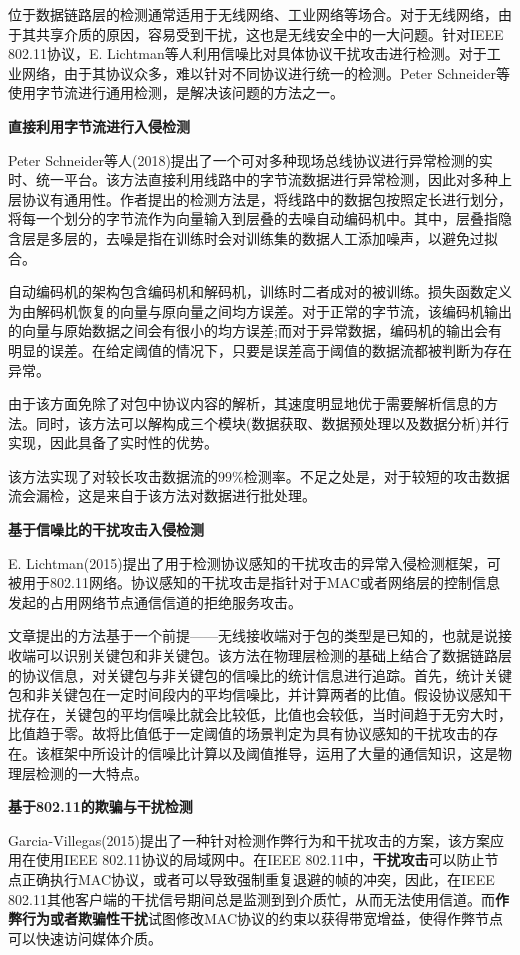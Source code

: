 \documentclass[12pt]{article} %
\begin{document}
位于数据链路层的检测通常适用于无线网络、工业网络等场合。对于无线网络，由于其共享介质的原因，容易受到干扰，这也是无线安全中的一大问题。针对IEEE 802.11协议，E. Lichtman等人利用信噪比对具体协议干扰攻击进行检测。对于工业网络，由于其协议众多，难以针对不同协议进行统一的检测。Peter Schneider等使用字节流进行通用检测，是解决该问题的方法之一。

\textbf{直接利用字节流进行入侵检测}

Peter Schneider等人(2018)\cite{cyber_phy}提出了一个可对多种现场总线协议进行异常检测的实时、统一平台。该方法直接利用线路中的字节流数据进行异常检测，因此对多种上层协议有通用性。作者提出的检测方法是，将线路中的数据包按照定长进行划分，将每一个划分的字节流作为向量输入到层叠的去噪自动编码机中。其中，层叠指隐含层是多层的，去噪是指在训练时会对训练集的数据人工添加噪声，以避免过拟合。

自动编码机的架构包含编码机和解码机，训练时二者成对的被训练。损失函数定义为由解码机恢复的向量与原向量之间均方误差。对于正常的字节流，该编码机输出的向量与原始数据之间会有很小的均方误差;而对于异常数据，编码机的输出会有明显的误差。在给定阈值的情况下，只要是误差高于阈值的数据流都被判断为存在异常。

由于该方面免除了对包中协议内容的解析，其速度明显地优于需要解析信息的方法。同时，该方法可以解构成三个模块(数据获取、数据预处理以及数据分析)并行实现，因此具备了实时性的优势。

该方法实现了对较长攻击数据流的99\%检测率。不足之处是，对于较短的攻击数据流会漏检，这是来自于该方法对数据进行批处理。

\textbf{基于信噪比的干扰攻击入侵检测}

E. Lichtman(2015)\cite{Lichtman}提出了用于检测协议感知的干扰攻击的异常入侵检测框架，可被用于802.11网络。协议感知的干扰攻击是指针对于MAC或者网络层的控制信息发起的占用网络节点通信信道的拒绝服务攻击。

文章提出的方法基于一个前提——无线接收端对于包的类型是已知的，也就是说接收端可以识别关键包和非关键包。该方法在物理层检测的基础上结合了数据链路层的协议信息，对关键包与非关键包的信噪比的统计信息进行追踪。首先，统计关键包和非关键包在一定时间段内的平均信噪比，并计算两者的比值。假设协议感知干扰存在，关键包的平均信噪比就会比较低，比值也会较低，当时间趋于无穷大时，比值趋于零。故将比值低于一定阈值的场景判定为具有协议感知的干扰攻击的存在。该框架中所设计的信噪比计算以及阈值推导，运用了大量的通信知识，这是物理层检测的一大特点。

\textbf{基于802.11的欺骗与干扰检测}

Garcia-Villegas(2015)\cite{Garcia-Villegas}提出了一种针对检测作弊行为和干扰攻击的方案，该方案应用在使用IEEE 802.11协议的局域网中。在IEEE 802.11中，\textbf{干扰攻击}可以防止节点正确执行MAC协议，或者可以导致强制重复退避的帧的冲突，因此，在IEEE 802.11其他客户端的干扰信号期间总是监测到到介质忙，从而无法使用信道。而\textbf{作弊行为或者欺骗性干扰}试图修改MAC协议的约束以获得带宽增益，使得作弊节点可以快速访问媒体介质。
\end{document}
